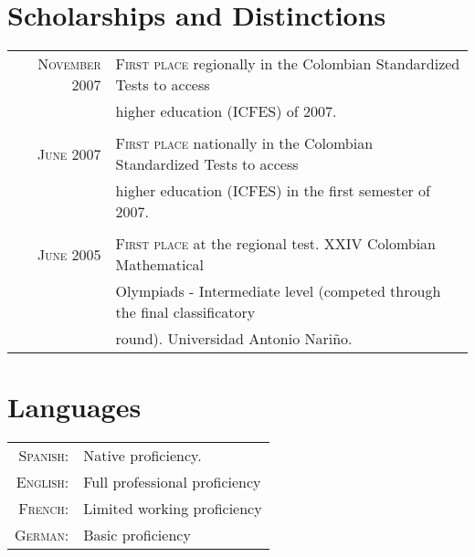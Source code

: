 \documentclass[a4paper,10pt]{article} %
\begin{document}


\color{OrangeRed}
\section{Scholarships and Distinctions}
\color{black}

\begin{tabular}{rl}

\textsc{November} 2007 & \textsc{First place} regionally in the Colombian Standardized Tests to access \\ 
& higher education (ICFES) of 2007. \\ 
&\\

\textsc{June} 2007 & \textsc{First place} nationally in the Colombian Standardized Tests to access  \\ 
& higher education (ICFES) in the first semester of 2007. \\ 
&\\

\textsc{June } 2005 & \textsc{First place} at the regional test. XXIV Colombian Mathematical\\ 
& Olympiads - Intermediate level (competed through the final classificatory \\ & round). Universidad Antonio Nariño.\\

\end{tabular}


\color{OrangeRed}
\section{Languages}
\color{black}

\begin{tabular}{rl}
\textsc{Spanish:} & Native proficiency.\\

\textsc{English:} & Full professional proficiency \\

\textsc{French:} & Limited working proficiency \\

\textsc{German:} & Basic proficiency \\
\end{tabular}
\end{document}

